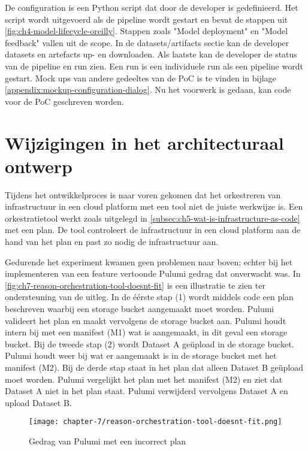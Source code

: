 De configuration is een Python script dat door de developer is gedefinieerd. Het script wordt uitgevoerd als de pipeline wordt gestart en bevat de stappen uit \autoref{fig:ch4-model-lifecycle-oreilly}. Stappen zoals \string"Model deployment\string" en \string"Model feedback\string" vallen uit de scope. In de datasets/\glspl{artifact} sectie kan de developer datasets en artefacts up- en downloaden. Als laatste kan de developer de status van de pipeline en run zien. Een run is een individuele run als een pipeline wordt gestart. Mock ups van andere gedeeltes van de PoC is te vinden in bijlage \ref{appendix:mockup-configuration-dialog}. Nu het voorwerk is gedaan, kan code voor de PoC geschreven worden.

\section{Wijzigingen in het architecturaal ontwerp}\label{sec:ch7-wijzigingen-in-het-architecturaal-ontwerp}
Tijdens het ontwikkelproces is naar voren gekomen dat het orkestreren van infrastructuur in een cloud platform met een tool niet de juiste werkwijze is. Een orkestratietool werkt zoals uitgelegd in \autoref{subsec:ch5-wat-is-infrastructure-as-code} met een plan. De tool controleert de infrastructuur in een cloud platform aan de hand van het plan en past zo nodig de infrastructuur aan.

Gedurende het experiment kwamen geen problemen naar boven; echter bij het implementeren van een feature vertoonde Pulumi gedrag dat onverwacht was. In \autoref{fig:ch7-reason-orchestration-tool-doesnt-fit} is een illustratie te zien ter ondersteuning van de uitleg. In de éérste stap (1) wordt middels code een plan beschreven waarbij een storage bucket aangemaakt moet worden. Pulumi valideert het plan en maakt vervolgens de storage bucket aan. Pulumi houdt intern bij met een manifest (M1) wat is aangemaakt, in dit geval een storage bucket. Bij de tweede stap (2) wordt Dataset A geüpload in de storage bucket. Pulumi houdt weer bij wat er aangemaakt is in de storage bucket met het manifest (M2). Bij de derde stap staat in het plan dat alleen Dataset B geüpload moet worden. Pulumi vergelijkt het plan met het manifest (M2) en ziet dat Dataset A niet in het plan staat. Pulumi verwijderd vervolgens Dataset A en upload Dataset B.

\begin{figure}[hbt!]
  \centering
  \texttt{[image: chapter-7/reason-orchestration-tool-doesnt-fit.png]}
  \caption{Gedrag van Pulumi met een incorrect plan}
  \label{fig:ch7-reason-orchestration-tool-doesnt-fit}
\end{figure}

